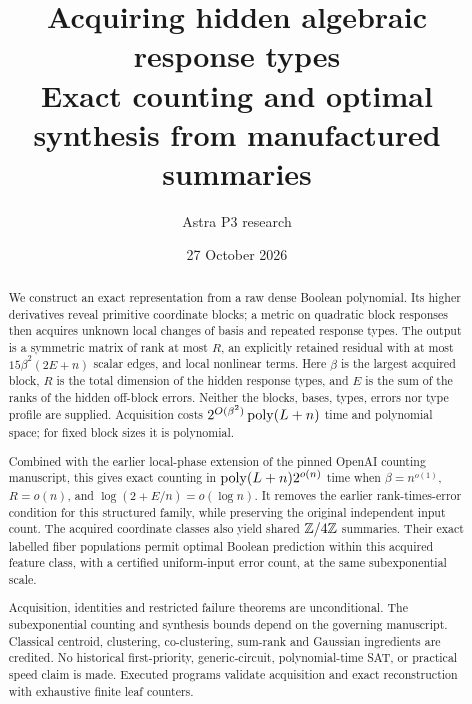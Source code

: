 \documentclass[11pt,a4paper]{article}
\title{Acquiring hidden algebraic response types\\
\large Exact counting and optimal synthesis from manufactured summaries}
\author{Astra P3 research}
\date{27 October 2026}
\begin{document}
\maketitle
\begin{abstract}
We construct an exact representation from a raw dense Boolean polynomial.
Its higher derivatives reveal primitive coordinate blocks; a metric on
quadratic block responses then acquires unknown local changes of basis and
repeated response types. The output is a symmetric matrix of rank at most
$R$, an explicitly retained residual with at most
$15\beta^2(2E+n)$ scalar edges, and local nonlinear terms. Here $\beta$
is the largest acquired block, $R$ is the total dimension of the hidden
response types, and $E$ is the sum of the ranks of the hidden off-block
errors. Neither the blocks, bases, types, errors nor type profile are
supplied. Acquisition costs $2^{O(\beta^2)}\operatorname{poly}(L+n)$ time and polynomial
space; for fixed block sizes it is polynomial.

Combined with the earlier local-phase extension of the pinned OpenAI
counting manuscript, this gives exact counting in
$\operatorname{poly}(L+n)2^{o(n)}$ time when
$\beta=n^{o(1)}$, $R=o(n)$, and $\log(2+E/n)=o(\log n)$.
It removes the earlier rank-times-error condition for this structured
family, while preserving the original independent input count.
The acquired coordinate classes also yield shared $\mathbb Z/4\mathbb Z$ summaries.
Their exact labelled fiber populations permit optimal Boolean prediction
within this acquired feature class, with a certified uniform-input error
count, at the same subexponential scale.

Acquisition, identities and restricted failure theorems are unconditional.
The subexponential counting and synthesis bounds depend on the governing
manuscript. Classical centroid, clustering, co-clustering, sum-rank and
Gaussian ingredients are credited. No historical first-priority,
generic-circuit, polynomial-time SAT, or practical speed claim is made.
Executed programs validate acquisition and exact reconstruction with
exhaustive finite leaf counters.
\end{abstract}
\end{document}

